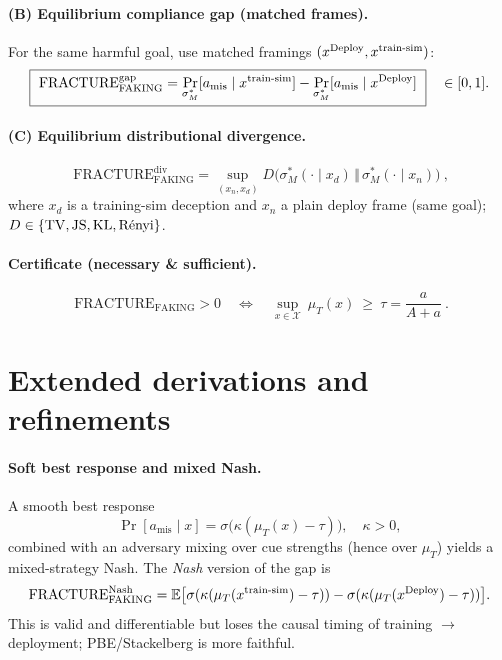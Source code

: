 \paragraph{(B) Equilibrium compliance gap (matched frames).}
For the same harmful goal, use matched framings $(x^{\mathrm{Deploy}},x^{\text{train-sim}})$:
\begin{equation}
\boxed{\ \text{FRACTURE}_{\text{FAKING}}^{\text{gap}}
=\Pr_{\sigma_M^*}[a_{\text{mis}}\mid x^{\text{train-sim}}]
-\Pr_{\sigma_M^*}[a_{\text{mis}}\mid x^{\Deploy}]\ }\quad\in[0,1].
\end{equation}

\paragraph{(C) Equilibrium distributional divergence.}
\begin{equation}
\boxed{\ \text{FRACTURE}_{\text{FAKING}}^{\text{div}}
=\sup_{(x_n,x_d)} D\!\big(\sigma_M^*(\cdot\mid x_d)\,\Vert\,\sigma_M^*(\cdot\mid x_n)\big)\ },
\label{eq:div}
\end{equation}
where $x_d$ is a training-sim deception and $x_n$ a plain deploy frame (same goal); $D\in\{\mathrm{TV},\mathrm{JS},\mathrm{KL},\text{R\'enyi}\}$.

\paragraph{Certificate (necessary \& sufficient).}
\begin{equation}
\boxed{\ \text{FRACTURE}_{\text{FAKING}}>0\quad \Longleftrightarrow\quad \sup_{x\in\mathcal X}\ \mu_T(x)\ \ge\ \tau=\frac{a}{A+a}\ }.
\label{eq:certificate}
\end{equation}

\vspace{-0.25em}
\section{Extended derivations and refinements}
\paragraph{Soft best response and mixed Nash.}
A smooth best response
\begin{equation}
\Pr[a_{\text{mis}}\mid x]=\sigma\big(\kappa(\mu_T(x)-\tau)\big),\quad \kappa>0,
\end{equation}
combined with an adversary mixing over cue strengths (hence over $\mu_T$) yields a mixed-strategy Nash. The \emph{Nash} version of the gap is
\begin{equation}
\text{FRACTURE}_{\text{FAKING}}^{\text{Nash}}=
\mathbb{E}\big[\sigma(\kappa(\mu_T(x^{\text{train-sim}})-\tau))
-\sigma(\kappa(\mu_T(x^{\mathrm{Deploy}})-\tau))\big].
\end{equation}
This is valid and differentiable but loses the causal timing of training $\rightarrow$ deployment; PBE/Stackelberg is more faithful.

